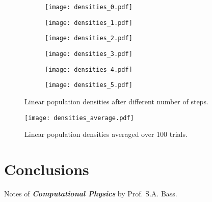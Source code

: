 \documentclass{article}
\begin{document}
\begin{figure}[h!]
\centering
\begin{subfigure}[b]{0.32\textwidth}
\texttt{[image: densities\_0.pdf]}
\end{subfigure}
\begin{subfigure}[b]{0.32\textwidth}
\texttt{[image: densities\_1.pdf]}
\end{subfigure}
\begin{subfigure}[b]{0.32\textwidth}
\texttt{[image: densities\_2.pdf]}
\end{subfigure}
\begin{subfigure}[b]{0.32\textwidth}
\texttt{[image: densities\_3.pdf]}
\end{subfigure}
\begin{subfigure}[b]{0.32\textwidth}
\texttt{[image: densities\_4.pdf]}
\end{subfigure}
\begin{subfigure}[b]{0.32\textwidth}
\texttt{[image: densities\_5.pdf]}
\end{subfigure}
\label{densities}
\caption{Linear population densities after different number of steps.}
\end{figure}

\begin{figure}[h!]
\centering
\texttt{[image: densities\_average.pdf]}
\caption{Linear population densities averaged over 100 trials.}
\label{average100}
\end{figure}

\section{Conclusions}

\begin{thebibliography}{9}
Notes of \textbf{\textit{Computational Physics}} by Prof. S.A. Bass.
\end{thebibliography}
\end{document}
